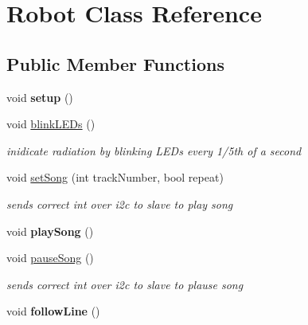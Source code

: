 \hypertarget{classRobot}{\section{Robot Class Reference}
\label{classRobot}
}
\subsection*{Public Member Functions}
\begin{DoxyCompactItemize}
\item 
\hypertarget{classRobot_a1fc37e3c329d59795f6adf44199d4df9}{void {\bfseries setup} ()}\label{classRobot_a1fc37e3c329d59795f6adf44199d4df9}

\item 
\hypertarget{classRobot_a4215f7e880311c2118f387df75effaf2}{void \hyperlink{classRobot_a4215f7e880311c2118f387df75effaf2}{blink\-L\-E\-Ds} ()}\label{classRobot_a4215f7e880311c2118f387df75effaf2}

\begin{DoxyCompactList}\small\item\em inidicate radiation by blinking L\-E\-Ds every 1/5th of a second \end{DoxyCompactList}\item 
\hypertarget{classRobot_a87e94e8db5092976d1125c674cf2b519}{void \hyperlink{classRobot_a87e94e8db5092976d1125c674cf2b519}{set\-Song} (int track\-Number, bool repeat)}\label{classRobot_a87e94e8db5092976d1125c674cf2b519}

\begin{DoxyCompactList}\small\item\em sends correct int over i2c to slave to play song \end{DoxyCompactList}\item 
\hypertarget{classRobot_ad86dbbb2ad0d065f3e4c30fd4b742e1c}{void {\bfseries play\-Song} ()}\label{classRobot_ad86dbbb2ad0d065f3e4c30fd4b742e1c}

\item 
\hypertarget{classRobot_a7c4cf197187f9f7dcb883ebc58f52b93}{void \hyperlink{classRobot_a7c4cf197187f9f7dcb883ebc58f52b93}{pause\-Song} ()}\label{classRobot_a7c4cf197187f9f7dcb883ebc58f52b93}

\begin{DoxyCompactList}\small\item\em sends correct int over i2c to slave to plause song \end{DoxyCompactList}\item 
\hypertarget{classRobot_a6e3caf6e0346f6a54557eb57a79fc4f4}{void {\bfseries follow\-Line} ()}\label{classRobot_a6e3caf6e0346f6a54557eb57a79fc4f4}


\end{DoxyCompactItemize}

